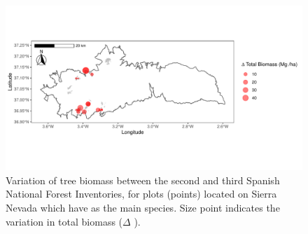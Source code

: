 \begin{figure}
    \centering
    \includegraphics[width=\textwidth]{img/carbon/carbon-mapa-ifn.pdf}
    \caption{Variation of tree biomass between the second and third Spanish National Forest Inventories, for plots (points) located on Sierra Nevada which have \Qp as the main species. Size point indicates the variation in total biomass ($\Delta$ \mgha).}
    \label{fig:carbon:ifn}
\end{figure}

\begin{table}[]
\caption{Temporal evolution of the total biomass (\mgha) of \Qp and the total carbon (\mgha) between the second (SNFI2) and third (SNFI3) Spanish National Forest Inventories. Plots were aggregated by loss/gains of the tree numbers ($\Delta$ trees), and also by increase/decrease of biomass during the period analyzed. The total variation in biomass (\emph{i.e.} sum for all plots), and the average variation per plot are shown for each category. }
\footnotesize
\label{tab:carbon:temporal}
\end{table} 
\normalsize

